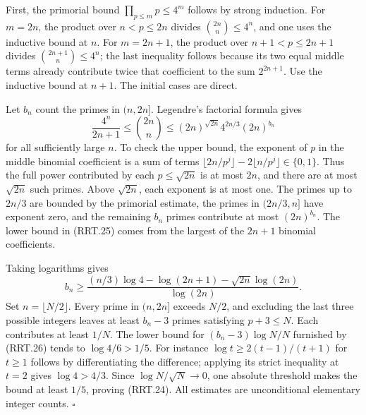 \documentclass[11pt,a4paper]{article}
\numberwithin{equation}{section}
\theoremstyle{remark}\newtheorem{remark}[theorem]{Remark}
\begin{document}
First, the primorial bound $\prod_{p\le m}p\le4^m$ follows by
strong induction.  For $m=2n$, the product over $n<p\le2n$
divides $\binom{2n}{n}\le4^n$, and one uses the inductive bound
at $n$.  For $m=2n+1$, the product over
$n+1<p\le2n+1$ divides $\binom{2n+1}{n}\le4^n$; the last
inequality follows because its two equal middle terms already
contribute twice that coefficient to the sum $2^{2n+1}$.
Use the inductive bound at $n+1$.  The initial cases are direct.

Let $b_n$ count the primes in $(n,2n]$.  Legendre's factorial
formula gives
\[
 \frac{4^n}{2n+1}\le\binom{2n}{n}
                 \le (2n)^{\sqrt{2n}}4^{2n/3}(2n)^{b_n}
 \tag{RRT.25}
\]
for all sufficiently large $n$.  To check the upper bound,
the exponent of $p$ in the middle binomial coefficient is a sum
of terms
$\lfloor2n/p^j\rfloor-2\lfloor n/p^j\rfloor\in\{0,1\}$.
Thus the full power contributed by each $p\le\sqrt{2n}$ is at
most $2n$, and there are at most $\sqrt{2n}$ such primes.
Above $\sqrt{2n}$, each exponent is at most one.  The primes up
to $2n/3$ are bounded by the primorial estimate, the primes in
$(2n/3,\allowbreak{} n]$ have exponent zero, and the remaining $b_n$ primes
contribute at most $(2n)^{b_n}$.  The lower bound in (RRT.25)
comes from the largest of the $2n+1$ binomial coefficients.

Taking logarithms gives
\[
 b_n\ge\frac{(n/3)\log4-\log(2n+1)
                           -\sqrt{2n}\log(2n)}{\log(2n)}.
 \tag{RRT.26}
\]
Set $n=\lfloor N/2\rfloor$.  Every prime in $(n,2n]$ exceeds
$N/2$, and excluding the last three possible integers leaves
at least $b_n-3$ primes satisfying $p+3\le N$.
Each contributes at least $1/N$.  The lower bound for
$(b_n-3)\log N/N$ furnished by (RRT.26) tends to
$\log4/6>1/5$.  For instance
$\log t\ge2(t-1)/(t+1)$ for $t\ge1$ follows by differentiating
the difference; applying its strict inequality at $t=2$ gives
$\log4>4/3$.  Since $\log N/\sqrt N\to0$, one absolute
threshold makes the bound at least $1/5$, proving (RRT.24).
All estimates are unconditional elementary integer counts.
\hfill$\square$

\end{document}
